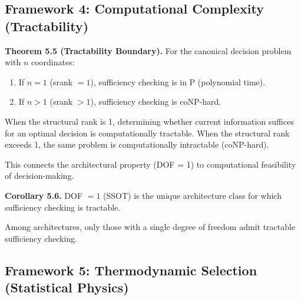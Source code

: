 
\subsection{Framework 4: Computational Complexity (Tractability)}

\begin{formal}
\textbf{Theorem 5.5 (Tractability Boundary).} For the canonical decision problem with $n$ coordinates:
\begin{enumerate}
\item If $n = 1$ (srank $= 1$), sufficiency checking is in P (polynomial time).
\item If $n > 1$ (srank $> 1$), sufficiency checking is coNP-hard.
\end{enumerate}
\end{formal}

\begin{informal}
When the structural rank is 1, determining whether current information suffices for an optimal decision is computationally tractable. When the structural rank exceeds 1, the same problem is computationally intractable (coNP-hard).
\end{informal}


This connects the architectural property (DOF = 1) to computational feasibility of decision-making.

\begin{formal}
\textbf{Corollary 5.6.} DOF $= 1$ (SSOT) is the unique architecture class for which sufficiency checking is tractable.
\end{formal}

\begin{informal}
Among architectures, only those with a single degree of freedom admit tractable sufficiency checking.
\end{informal}


\subsection{Framework 5: Thermodynamic Selection (Statistical Physics)}


